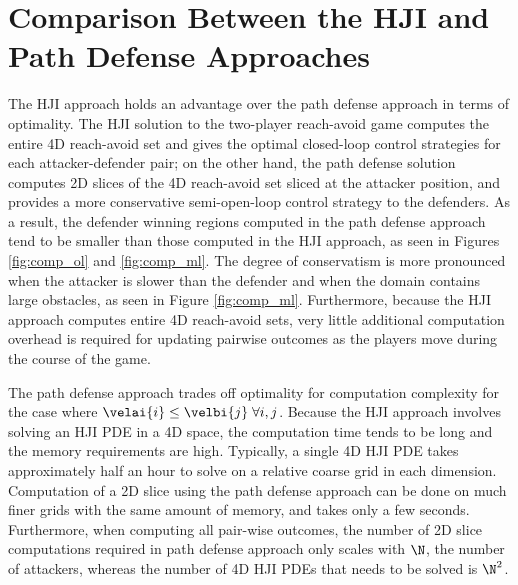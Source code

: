 \section{Comparison Between the HJI and Path Defense Approaches}
\label{sec:comparison}
The HJI approach holds an advantage over the path defense approach in terms of optimality. The HJI solution to the two-player reach-avoid game computes the entire 4D reach-avoid set and gives the optimal closed-loop control strategies for each attacker-defender pair; on the other hand, the path defense solution computes 2D slices of the 4D reach-avoid set sliced at the attacker position, and provides a more conservative semi-open-loop control strategy to the defenders. As a result, the defender winning regions computed in the path defense approach tend to be smaller than those computed in the HJI approach, as seen in Figures \ref{fig:comp_ol} and \ref{fig:comp_ml}. The degree of conservatism is more pronounced when the attacker is slower than the defender and when the domain contains large obstacles, as seen in Figure \ref{fig:comp_ml}. Furthermore, because the HJI approach computes entire 4D reach-avoid sets, very little additional computation overhead is required for updating pairwise outcomes as the players move during the course of the game.

The path defense approach trades off optimality for computation complexity for the case where $\velai{i}\le \velbi{j} \; \forall i,j$. Because the HJI approach involves solving an HJI PDE in a 4D space, the computation time tends to be long and the memory requirements are high. Typically, a single 4D HJI PDE takes approximately half an hour to solve on a relative coarse grid in each dimension. Computation of a 2D slice using the path defense approach can be done on much finer grids with the same amount of memory, and takes only a few seconds. Furthermore, when computing all pair-wise outcomes, the number of 2D slice computations required in path defense approach only scales with $\N$, the number of attackers, whereas the number of 4D HJI PDEs that needs to be solved is $\N^2$.
